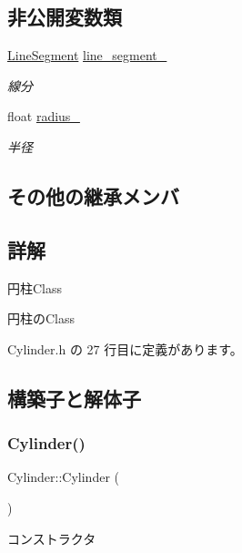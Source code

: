 \subsection*{非公開変数類}
\begin{DoxyCompactItemize}
\item 
\mbox{\hyperlink{class_line_segment}{Line\+Segment}} \mbox{\hyperlink{class_cylinder_a29d1c6c61863d19f617287da9474f1c4}{line\+\_\+segment\+\_\+}}
\begin{DoxyCompactList}\small\item\em 線分 \end{DoxyCompactList}\item 
float \mbox{\hyperlink{class_cylinder_abba752e07b11b7bfd8fcce64a6d9b678}{radius\+\_\+}}
\begin{DoxyCompactList}\small\item\em 半径 \end{DoxyCompactList}\end{DoxyCompactItemize}
\subsection*{その他の継承メンバ}


\subsection{詳解}
円柱\+Class 

円柱の\+Class 

 Cylinder.\+h の 27 行目に定義があります。



\subsection{構築子と解体子}
\mbox{\label{class_cylinder_a01dc978cb576f834b9545e43d4dad2a2}} 
\subsubsection{\texorpdfstring{Cylinder()}{Cylinder()}}
{\footnotesize\ttfamily Cylinder\+::\+Cylinder (\begin{DoxyParamCaption}{ }\end{DoxyParamCaption})}



コンストラクタ 



